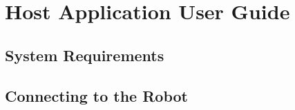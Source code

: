 \chapter{Host Application User Guide}
\label{Appendix D}


\section{System Requirements}


\section{Connecting to the Robot}

